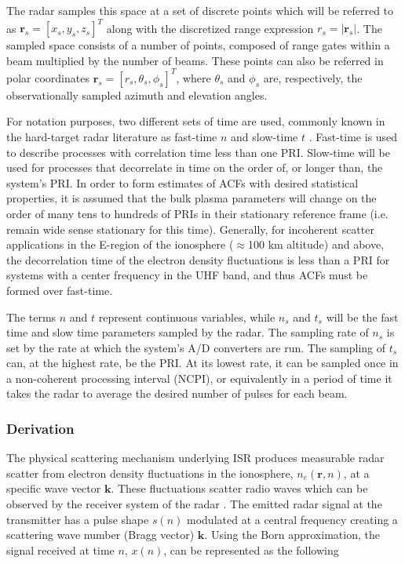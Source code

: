 The radar samples this space at a set of discrete points which will be referred to as $\mathbf{r}_s = [x_s,y_s,z_s]^T$ along with the discretized range expression $r_s=|\mathbf{r}_s|$. The sampled space consists of a number of points, composed of range gates within a beam multiplied by the number of beams. These points can also be referred in polar coordinates $\mathbf{r}_s = [r_s,\theta_s,\phi_s]^T$, where $\theta_s$  and $\phi_s$ are, respectively, the observationally sampled azimuth and elevation angles.

For notation purposes, two different sets of time are used, commonly known in the hard-target radar literature as fast-time $n$ and slow-time $t$ \citep{richards:fundamentalsigproc}. Fast-time is used to describe processes with correlation time less than one PRI. Slow-time will be used for processes that decorrelate in time on the order of, or longer than, the system's PRI. In order to form estimates of ACFs with desired statistical properties, it is assumed that the bulk plasma parameters will change on the order of many tens to hundreds of PRIs in their stationary reference frame (i.e. remain wide sense stationary for this time). Generally, for incoherent scatter applications in the E-region of the ionosphere ($\approx$100 km altitude) and above, the decorrelation time of the electron density fluctuations is less than a PRI for systems with a center frequency in the UHF band, and thus ACFs must be formed over fast-time.

The terms $n$ and $t$ represent continuous variables, while $n_s$ and $t_s$ will be the fast time and slow time parameters sampled by the radar. The sampling rate of $n_s$ is set by the rate at which the system's A/D converters are run. The sampling of $t_s$ can, at the highest rate, be the PRI. At its lowest rate, it can be sampled once in a non-coherent processing interval (NCPI), or equivalently in a period of time it takes the radar to average the desired number of pulses for each beam. 

\subsubsection{Derivation}

The physical scattering mechanism underlying ISR produces measurable radar scatter from electron density fluctuations in the ionosphere, $n_e(\mathbf{r},n)$, at a specific wave vector $\mathbf{k}$. These fluctuations scatter radio waves which can be observed by the receiver system of the radar \citep{dougherty:farley1960}. The emitted radar signal at the transmitter has a pulse shape $s(n)$ modulated at a central frequency creating a scattering wave number (Bragg vector) $\mathbf{k}$. Using the Born approximation, the signal received at time $n$, $x(n)$, can be represented as the following

